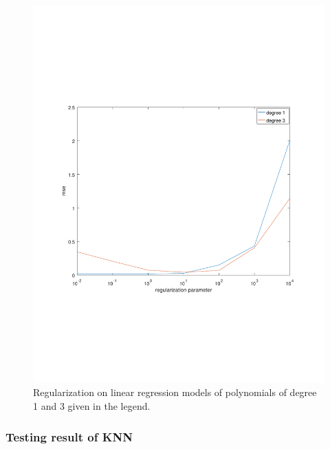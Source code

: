 \documentclass[]{article}
\begin{document}
 \begin{figure}[ht]
	\centering
	\includegraphics[trim= 10cm 5cm 10cm 5cm, scale=0.4]{proj1-4_2e-regul}
	\caption{Regularization on linear regression models of polynomials of degree 1 and 3 given in the legend.}
	\label{fig:proj1-4_2e-regul}
\end{figure}

\subsubsection{Testing result of KNN}
\end{document}
